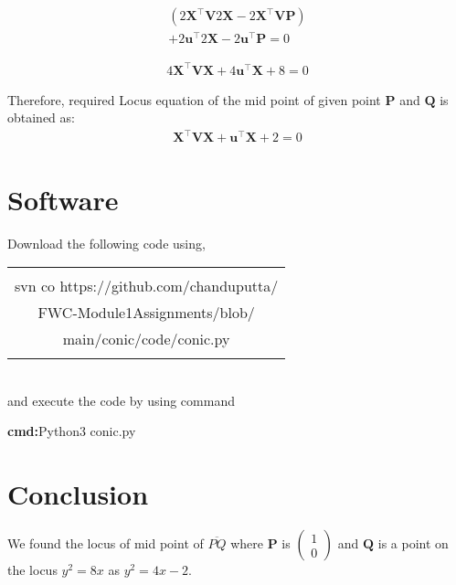 \documentclass[journal,12pt,twocolumn]{article}
\newcommand{\myvec}[1]{\ensuremath{\begin{pmatrix}#1\end{pmatrix}}}
\let\vec\mathbf
\begin{document}
\begin{multline}
    \label{eq:conic_quad_form}
    (2\vec{X}^{\top}\vec{V}2\vec{X}-2\vec{X}^{\top}\vec{V}\vec{P})\\+2\vec{u}^{\top}2\vec{X}-2\vec{u}^{\top}\vec{P}=0
    \end{multline}
    
\begin{multline}
    \label{eq:conic_quad_form}
    4\vec{X}^{\top}\vec{V}\vec{X}+4\vec{u}^{\top}\vec{X}+8=0
    \end{multline}


Therefore, required Locus equation of the mid point of given point $\vec{P}$ and $\vec{Q}$ is obtained as:
\begin{multline}
    \label{eq:conic_quad_form}
    \vec{X}^{\top}\vec{V}\vec{X}+\vec{u}^{\top}\vec{X}+2=0
    \end{multline}

 
\section{Software}
Download the following code using,
\begin{table}[h]
    \centering
    \begin{tabular}{|c|}
    \hline \\
         svn co https://github.com/chanduputta/\\FWC-Module1Assignments/blob/\\main/conic/code/conic.py \\
         \\
\hline
    \end{tabular}
\end{table}
\\
and execute the code by using command
\begin{center}
\textbf{cmd:}Python3  conic.py
\\
\end{center}

\section{Conclusion}
\begin{center}
We found the locus of mid point of $\overline{PQ}$ where $\vec{P}$ is $\myvec{ 1\\0}$ and $\vec{Q}$ is a point on the locus $y^{2} = 8x$ as $y^{2} = 4x - 2$.
\end{center}
\end{document}
